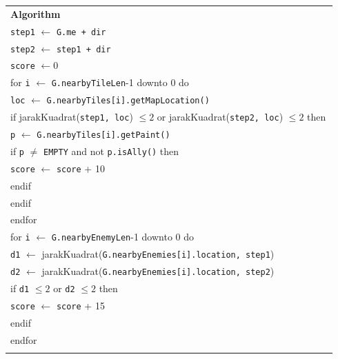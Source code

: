 \documentclass{article}
\newenvironment{pseudobox}
{
\centering
\begin{longtable}{|p{0.94\linewidth}|}
\hline
}
{
\\ \hline
\end{longtable}
\vspace{0.05cm}
}
\begin{document}
\begin{enumerate}[label=\alph*.]
\begin{enumerate}[label=\alph*.]
\begin{pseudobox}
\textbf{Algorithm} \\
\hspace*{1.5em}\texttt{step1} $\leftarrow$ \texttt{G.me + dir} \\
\hspace*{1.5em}\texttt{step2} $\leftarrow$ \texttt{step1 + dir} \\
\hspace*{1.5em}\texttt{score} $\leftarrow 0$ \\

\hspace*{1.5em}for \texttt{i} $\leftarrow$ \texttt{G.nearbyTileLen}-1 downto 0 do \\
\hspace*{3em}\texttt{loc} $\leftarrow$ \texttt{G.nearbyTiles[i].getMapLocation()} \\
\hspace*{3em}if jarakKuadrat(\texttt{step1, loc}) $\leq 2$ or jarakKuadrat(\texttt{step2, loc}) $\leq 2$ then \\
\hspace*{4.5em}\texttt{p} $\leftarrow$ \texttt{G.nearbyTiles[i].getPaint()} \\
\hspace*{4.5em}if \texttt{p} $\neq$ \texttt{EMPTY} and not \texttt{p.isAlly()} then \\
\hspace*{6em}\texttt{score} $\leftarrow$ \texttt{score} + 10 \\
\hspace*{4.5em}endif \\
\hspace*{3em}endif \\
\hspace*{1.5em}endfor \\

\hspace*{1.5em}for \texttt{i} $\leftarrow$ \texttt{G.nearbyEnemyLen}-1 downto 0 do \\
\hspace*{3em}\texttt{d1} $\leftarrow$ jarakKuadrat(\texttt{G.nearbyEnemies[i].location, step1}) \\
\hspace*{3em}\texttt{d2} $\leftarrow$ jarakKuadrat(\texttt{G.nearbyEnemies[i].location, step2}) \\
\hspace*{3em}if \texttt{d1} $\leq 2$ or \texttt{d2} $\leq 2$ then \\
\hspace*{4.5em}\texttt{score} $\leftarrow$ \texttt{score} + 15 \\
\hspace*{3em}endif \\
\hspace*{1.5em}endfor \\


\end{pseudobox}
\end{enumerate}
\end{enumerate}
\end{document}
